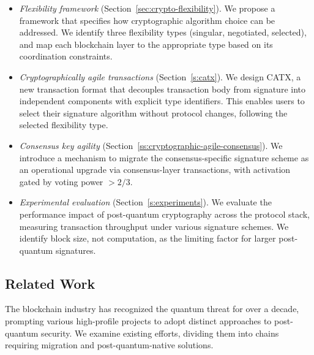 \begin{itemize}
    \item \textit{Flexibility framework} (Section~\ref{sec:crypto-flexibility}). 
    We propose a framework that specifies how cryptographic algorithm choice can be addressed. 
    We identify three flexibility types (singular, negotiated, selected), and map each blockchain layer to the appropriate type based on its coordination constraints.
    
    \item \textit{Cryptographically agile transactions} (Section~\ref{s:catx}). 
    We design CATX, a new transaction format that decouples transaction body from signature into independent components with explicit type identifiers.
    This enables users to select their signature algorithm without protocol changes, following the selected flexibility type.
    
    \item \textit{Consensus key agility} (Section~\ref{ss:cryptographic-agile-consensus}). 
    We introduce a mechanism to migrate the consensus-specific signature scheme as an operational upgrade via consensus-layer transactions, with activation gated by voting power $>2/3$.
    
    
    \item \textit{Experimental evaluation} (Section~\ref{s:experiments}). 
    We evaluate the performance impact of post-quantum cryptography across the protocol stack, measuring transaction throughput under various signature schemes.
    We identify block size, not computation, as the limiting factor for larger post-quantum signatures.
\end{itemize}

\subsection{Related Work}\label{subsec:related-work}

The blockchain industry has recognized the quantum threat for over a decade, prompting various high-profile projects to adopt distinct approaches to post-quantum security. We examine existing efforts, dividing them into chains requiring migration and post-quantum-native solutions.

